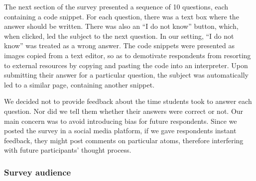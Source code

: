 The next section of the survey presented a sequence of 10 questions, each containing a code snippet. For each question, there was a text box where the answer should be written. There was also an ``I do not know'' button, which, when clicked, led the subject to the next question. In our setting, ``I do not know'' was treated as a wrong answer. The code snippets were presented as images copied from a text editor, so as to demotivate respondents from resorting to external resources by copying and pasting the code into an interpreter. Upon submitting their answer for a particular question, the subject was automatically led to a similar page, containing another snippet.
    
We decided not to provide feedback about the time students took to answer each question. Nor did we tell them whether their answers were correct or not. Our main concern was to avoid introducing bias for future respondents. Since we posted the survey in a social media platform, if we gave respondents instant feedback, they might post comments on particular atoms, therefore interfering with future participants' thought process.



\subsubsection{Survey audience}

